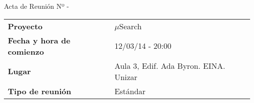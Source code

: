 \begin{center}	
\Large{Acta de Reunión Nº \numeroDeReunion\hspace{0.25em}-\hspace{0.25em}\tituloReunion}
\end{center}
\vspace{1.5em}

\begin{longtable}{ | L{\tabcolsep} |
				     L{\tabcolsep} | }
\hline %
  \\
\hline %
{\bf Proyecto} & $\mu$Search \\ 
\hline %
{\bf Fecha y hora de comienzo} & 12/03/14 - 20:00 \\
\hline %
{\bf Lugar} & Aula 3, Edif. Ada Byron. EINA. Unizar \\
\hline %
{\bf Tipo de reunión} & Estándar \\
\hline %
\end{longtable}


